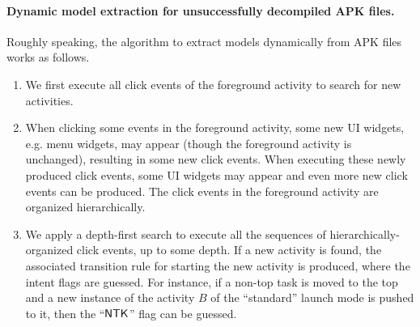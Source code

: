
\paragraph{Dynamic model extraction for unsuccessfully decompiled APK files. }
Roughly speaking, the algorithm to extract {\AMASS} models dynamically from APK files works as follows.
\begin{enumerate}
\item We first execute all click events of the foreground activity to search for new activities. 
%
\item When clicking some events in the foreground activity, some new UI widgets, e.g. menu widgets, may appear (though the foreground activity is unchanged), resulting in some new click events.  When executing these newly produced click events, some UI widgets may appear and even more new click events can be produced. The click events in the foreground activity are organized hierarchically.  
%	
\item We apply a depth-first search to execute all the sequences of hierarchically-organized click events, up to some depth. If a new activity is found,  the associated transition rule for starting the new activity is produced, where the intent flags are guessed. For instance, if a non-top task is moved to the top and a new instance of the activity $B$ of the ``standard'' launch mode is pushed to it, then the ``${\sf NTK}$'' flag can be guessed. 
\end{enumerate}

